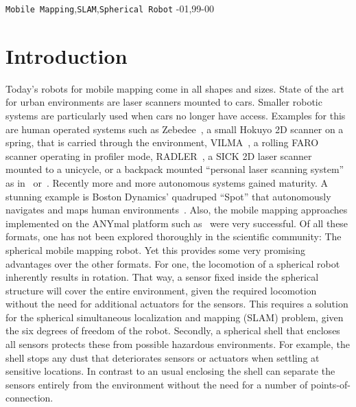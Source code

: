 \documentclass[5p]{elsarticle}
\begin{document}
\begin{frontmatter}
\begin{keyword}
\texttt{Mobile Mapping}\sep \texttt{SLAM}\sep \texttt{Spherical Robot}
-01\sep  99-00
\end{keyword}

\end{frontmatter}

\linenumbers

\section{Introduction}

Today's robots for mobile mapping come in all shapes and sizes.
State of the art for urban environments are laser scanners mounted to cars.
Smaller robotic systems are particularly used when cars no longer have access.
Examples for this are human operated systems such as Zebedee~\cite{Bosse2012-zebedee}, a small Hokuyo 2D scanner on a spring, that is carried through the environment, VILMA~\cite{JPRS2016}, a rolling FARO scanner operating in profiler mode, RADLER~\cite{Borrmann2020-RADLER}, a SICK 2D laser scanner mounted to a unicycle, or a backpack mounted ``personal laser scanning system'' as in~\cite{LauterbackEtAl2015-Backpack} or~\cite{WWWLeicaBackpack}.
Recently more and more autonomous systems gained maturity.
A stunning example is Boston Dynamics' quadruped ``Spot'' that autonomously navigates and maps human environments~\cite{SpotRobot}.
Also, the mobile mapping approaches implemented on the ANYmal platform such as~\cite{Fankhauser2018-ANYmal} were very successful.
Of all these formats, one has not been explored thoroughly in the scientific community: The spherical mobile mapping robot.
Yet this provides some very promising advantages over the other formats.
For one, the locomotion of a spherical robot inherently results in rotation.
That way, a sensor fixed inside the spherical structure will cover the entire environment, given the required locomotion without the need for additional actuators for the sensors.
This requires a solution for the spherical simultaneous localization and mapping (SLAM) problem, given the six degrees of freedom of the robot.
Secondly, a spherical shell that encloses all sensors protects these from possible hazardous environments.  
For example, the shell stops any dust that deteriorates sensors or actuators when settling at sensitive locations.
In contrast to an usual enclosing the shell can separate the sensors entirely from the environment without the need for a number of points-of-connection. 
\end{document}
